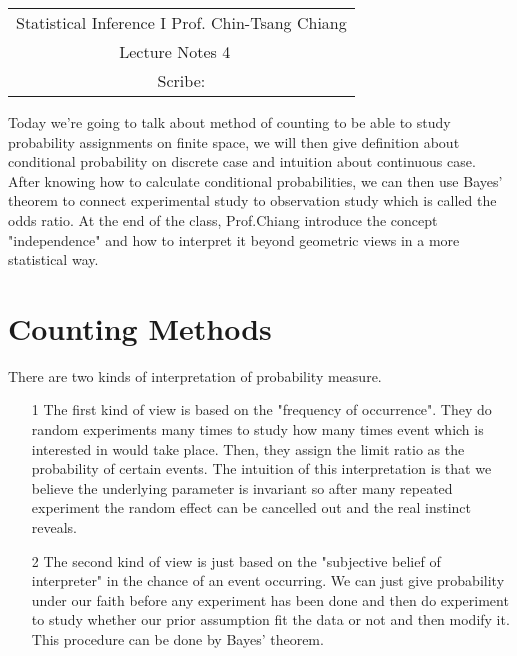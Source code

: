 \documentclass[Probability_Theory.tex]{subfiles}
\begin{document}
	\begin{center}
		\renewcommand{\arraystretch}{2}
		\begin{bfseries}
			\begin{tabular}{|c|}
				\hline
				Statistical Inference I \hfill Prof. Chin-Tsang Chiang\\
				\hspace{15em} {\large Lecture Notes 4} \hspace{15em}\ \\
				\lecdate \hfill Scribe: \scribe\\
				\hline
			\end{tabular}
			\renewcommand{\arraystretch}{1}
		\end{bfseries}
	\end{center}
Today we're going to talk about method of counting to be able to study probability assignments on finite space, we will then give definition about conditional probability on discrete case and intuition about continuous case. After knowing how to calculate conditional probabilities, we can then use Bayes' theorem to connect experimental study to observation study which is called the odds ratio. At the end of the class, Prof.Chiang introduce the concept "independence" and how to interpret it beyond geometric views in a more statistical way.
\section{Counting Methods}
  There are two kinds of interpretation of probability measure. 
\begin{enumerate}
\item[1]
  The first kind of view is based on the "frequency of occurrence". They do random experiments many times to study  how many times event which is interested in would take place. Then, they assign the limit ratio  as the probability of certain events. The intuition of this interpretation is that we believe the underlying parameter is invariant so after many repeated experiment the random effect can be cancelled out and the real instinct reveals. 
\item[2]
  The second kind of view is just based on the "subjective belief of interpreter" in the chance of an event occurring.  We can just give probability under our faith before any experiment has been done and then do experiment to study whether our prior assumption fit the data or not and then modify it. This procedure can be done by Bayes' theorem. 
\end{enumerate}
\end{document}
